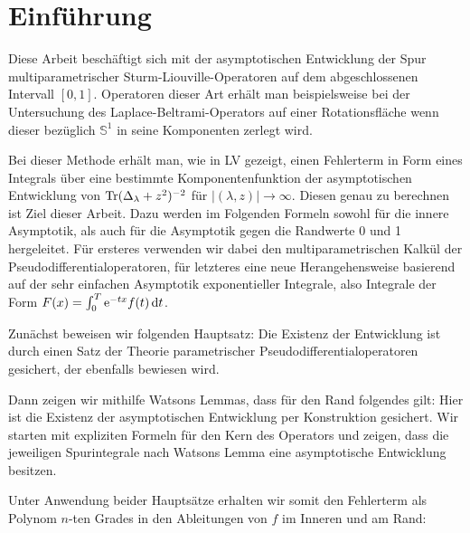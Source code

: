 \section{Einführung}
Diese Arbeit beschäftigt sich mit der asymptotischen Entwicklung der Spur
multiparametrischer Sturm-Liouville-Operatoren auf dem abgeschlossenen Intervall
$[0,1]$. Operatoren dieser Art erhält man beispielsweise bei der Untersuchung
des Laplace-Beltrami-Operators auf einer Rotationsfläche wenn dieser bezüglich
$\mathbb{S}^1$ in seine Komponenten zerlegt wird.


Bei dieser Methode erhält man, wie in LV gezeigt, einen Fehlerterm in Form eines
Integrals über eine bestimmte Komponentenfunktion der asymptotischen Entwicklung
von $\Tr(\Delta_\lambda + z^2)^{-2}$ für $\left|(\lambda, z)\right|\to\infty$.
Diesen genau zu berechnen ist Ziel dieser Arbeit. Dazu werden im Folgenden
Formeln sowohl für die innere Asymptotik, als auch für die Asymptotik gegen die
Randwerte 0 und 1 hergeleitet. Für ersteres verwenden wir dabei den
multiparametrischen Kalkül der Pseudodifferentialoperatoren, für letzteres eine
neue Herangehensweise basierend auf der sehr einfachen Asymptotik exponentieller
Integrale, also Integrale der Form $F(x) = \Integ[T]{0}{t}{\Eto{-tx}f(t)}$.

Zunächst beweisen wir folgenden Hauptsatz:
Die Existenz der Entwicklung ist durch einen Satz der Theorie parametrischer
Pseudodifferentialoperatoren gesichert, der ebenfalls bewiesen wird.

Dann zeigen wir mithilfe Watsons Lemmas, dass für den Rand folgendes gilt:
Hier ist die Existenz der asymptotischen Entwicklung per Konstruktion gesichert.
Wir starten mit expliziten Formeln für den Kern des Operators und zeigen, dass
die jeweiligen Spurintegrale nach Watsons Lemma eine asymptotische Entwicklung
besitzen.

Unter Anwendung beider Hauptsätze erhalten wir somit den Fehlerterm als Polynom
$n$-ten Grades in den Ableitungen von $f$ im Inneren und am Rand:

